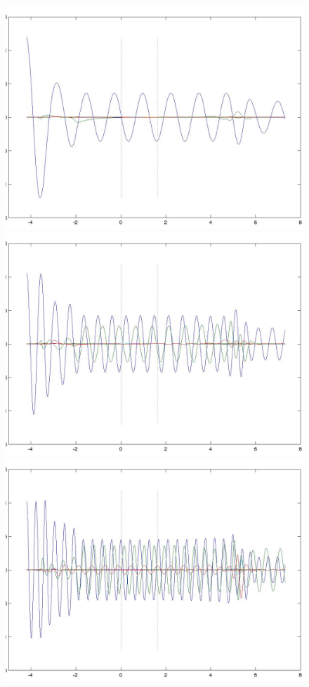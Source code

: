 \documentclass[numreferences]{kluwer}
\begin{document}
\begin{figure}[htb]
  \centering
  \includegraphics[scale=0.45]{phin1a}
  \includegraphics[scale=0.45]{phin2a}
  \includegraphics[scale=0.45]{phin3a}

\end{figure}
\end{document}

